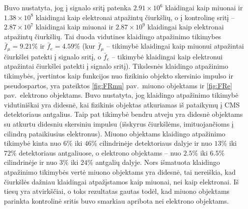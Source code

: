 \documentclass[a4paper, 12pt, oneside]{article}
\begin{document}
Buvo nustatyta, jog į signalo sritį patenka $2.91\!\times\!10^6$ klaidingai kaip miuonai ir $1.38\!\times\!10^8$ klaidingai
kaip elektronai atpažintų čiurkšlių, o į kontrolinę sritį -- $2.87\!\times\!10^7$ klaidingai kaip miuonai ir $2.87\times10^9$
klaidingai kaip elektronai atpažintų čiurkšlių.
Tai duoda vidutines klaidingo atpažinimo tikimybes $\bar{f}_{\mu}=9.21\%$ ir $\bar{f}_{e}=4.59\%$ (kur $\bar{f}_{\mu}$ -- tikimybė
klaidingai kaip miuonui atpažintai čiurkšlei patekti į signalo sritį, o $\bar{f}_{e}$ -- tikimybė klaidingai kaip elektronui
atpažintai čiurkšlei patekti į signalo sritį).
Tikslesnės klaidingo atpažinimo tikimybės, įvertintos kaip funkcijos nuo fizikinio objekto skersinio impulso ir pseudospartos,
yra pateiktos \ref{fig:FRmu} pav.\ miuono objektams ir \ref{fig:FRe} pav.\ elektrono objektams.
Buvo nustatyta, jog klaidingo atpažinimo tikimybė vidutiniškai yra didesnė, kai fizikinis objektas atkuriamas iš pataikymų į
CMS detektoriaus antgalius.
Taip pat tikimybė bendru atveju yra didesnė objektams su atkurtu didesniu skersiniu impulsu (išskyrus čiurkšlėms, imituojančioms
į cilindrą pataikiusius elektronus).
Miuono objektams klaidingo atpažinimo tikimybė kinta nuo $6\%$ iki $46\%$ cilindrinėje detektoriaus dalyje ir nuo $13\%$ iki
$72\%$ detektoriaus antgaliuose, o elektrono objektams -- nuo $2.5\%$ iki $6.5\%$ cilindrinėje ir nuo $3\%$ iki $24\%$ antgalių dalyje. 
Nors išmatuota klaidingo atpažinimo tikimybės vertė miuono objektams yra didesnė, tai nereiškia, kad čiurkšlės dažniau klaidingai
atpažįstamos kaip miuonai, nei kaip elektronai.
Iš tiesų yra atvirkščiai, o toks rezultatas gautas todėl, kad miuono objektams parinkta kontrolinė sritis buvo smarkiau apribota
nei elektrono objektams.
\end{document}
